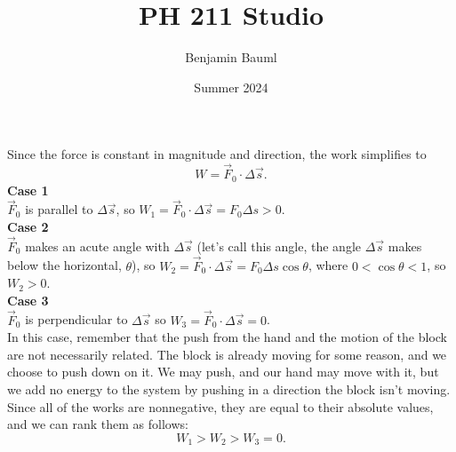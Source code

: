 \documentclass[]{article}
\title{PH 211 Studio \Week}
\author{Benjamin Bauml}
\date{Summer 2024}
\begin{document}
\begin{TeacherMargin}
\noindent Since the force is constant in magnitude and direction, the work simplifies to
\[
W = \vec{F}_{0} \cdot \Delta\vec{s}.
\]
\textbf{Case 1} \\
$\vec{F}_{0}$ is parallel to $\Delta\vec{s}$, so $W_{1} = \vec{F}_{0} \cdot \Delta\vec{s} = F_{0}\Delta s > 0$. \\
\textbf{Case 2} \\
$\vec{F}_{0}$ makes an acute angle with $\Delta \vec{s}$ (let's call this angle, the angle $\Delta \vec{s}$ makes below the horizontal, $\theta$), so $W_{2} = \vec{F}_{0} \cdot \Delta\vec{s} = F_{0}\Delta s\cos\theta$, where $0<\cos\theta<1$, so $W_{2}>0$. \\
\textbf{Case 3} \\
$\vec{F}_{0}$ is perpendicular to $\Delta \vec{s}$ so $W_{3} = \vec{F}_{0} \cdot \Delta\vec{s} = 0$. \\
In this case, remember that the push from the hand and the motion of the block are not necessarily related. The block is already moving for some reason, and we choose to push down on it. We may push, and our hand may move with it, but we add no energy to the system by pushing in a direction the block isn't moving. \\

\noindent Since all of the works are nonnegative, they are equal to their absolute values, and we can rank them as follows:
\[
W_{1} > W_{2} > W_{3} = 0.
\]
\end{TeacherMargin}
\end{document}
